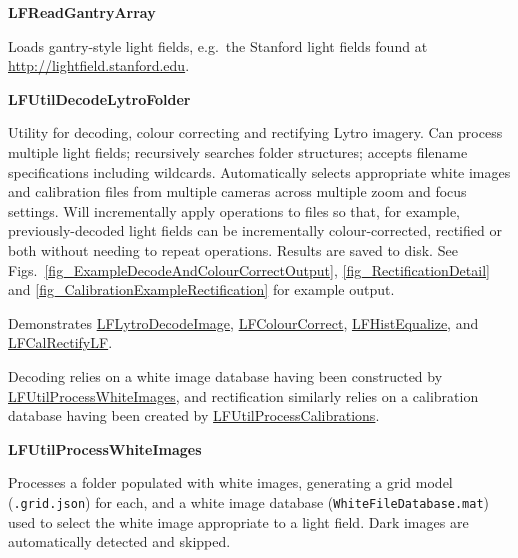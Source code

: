 \documentclass[onecolumn]{article}
\newcommand{\DeclareFunction}[1]{\hypertarget{#1}{#1}}
\newcommand{\CiteFunction}[1]{\hyperlink{#1}{\small #1}}
\newcommand{\NewFunctionEntry}[3]{%
\vspace{0.4em}%
	\hspace{1em}\begin{minipage}[t]{\linewidth}%
	\textbf{\DeclareFunction{#1}#2}%
	\end{minipage}\vspace{0.2em}\par
	\hspace*{3em}\begin{minipage}[t]{0.9\linewidth}%
	\protect #3 \vspace{0.4em}
	\end{minipage}%
	\par%
}
\newcommand{\SymbolText}[1]{\texttt{\small #1}}
\begin{document}
\begin{appendices}
\NewFunctionEntry{LFReadGantryArray}{}
{Loads gantry-style light fields, e.g.\ the Stanford light fields found at \url{http://lightfield.stanford.edu}.}

\NewFunctionEntry{LFUtilDecodeLytroFolder}{}
{Utility for decoding, colour correcting and rectifying Lytro imagery. Can process multiple light fields; recursively searches folder structures; accepts filename specifications including wildcards. Automatically selects appropriate white images and calibration files from multiple cameras across multiple zoom and focus settings. Will incrementally apply operations to files so that, for example, previously-decoded light fields can be incrementally colour-corrected, rectified or both without needing to repeat operations. Results are saved to disk. See Figs.~\ref{fig_ExampleDecodeAndColourCorrectOutput}, \ref{fig_RectificationDetail} and \ref{fig_CalibrationExampleRectification} for example output.

Demonstrates \CiteFunction{LFLytroDecodeImage}, \CiteFunction{LFColourCorrect}, \CiteFunction{LFHistEqualize}, and \CiteFunction{LFCalRectifyLF}.

Decoding relies on a white image database having been constructed by \CiteFunction{LFUtilProcessWhiteImages}, and rectification similarly relies on a calibration database having been created by \CiteFunction{LFUtilProcessCalibrations}.}

\NewFunctionEntry{LFUtilProcessWhiteImages}{}
{Processes a folder populated with white images, generating a grid model (\SymbolText{.grid.json}) for each, and a white image database (\SymbolText{WhiteFileDatabase.mat}) used to select the white image appropriate to a light field. Dark images are automatically detected and skipped.}


\end{appendices}
\end{document}
